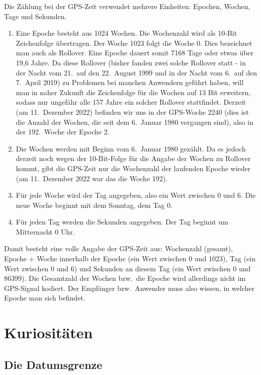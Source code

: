 Die Z\"ahlung bei der GPS-Zeit verwendet mehrere Einheiten: Epochen, Wochen, Tage und Sekunden.
\begin{enumerate}
\item
Eine Epoche 
besteht aus 1024 Wochen. Die Wochenzahl wird als 10-Bit Zeichenfolge \"ubertragen. 
Der Woche 1023 folgt die Woche 0. Dies bezeichnet man auch als Rollover. 
Eine Epoche dauert somit
7168 Tage oder etwas \"uber 19,6 Jahre. Da diese Rollover (bisher fanden
zwei solche Rollover statt - in der Nacht vom 21.\ auf den 22.\ August 1999 und in der Nacht vom 
6.\ auf den 7.\ April 2019) zu Problemen bei manchen Anwendern gef\"uhrt haben, will
man in naher Zukunft die Zeichenfolge f\"ur die Wochen auf 13 Bit erweitern, sodass nur ungef\"ahr alle 157 Jahre
ein solcher Rollover stattfindet. Derzeit (am 11.\ Dezember 2022) befinden wir uns in der GPS-Woche 2240 (dies ist
die Anzahl der Wochen, die seit dem 6.\ Januar 1980 vergangen sind), also in der 192.\ Woche der Epoche 2.
\item
Die Wochen 
werden mit Beginn vom 6.\ Januar 1980 gez\"ahlt. Da es jedoch derzeit noch wegen der 10-Bit-Folge
f\"ur die Angabe der Wochen zu Rollover kommt, gibt die GPS-Zeit nur die Wochenzahl der laufenden Epoche
wieder (am 11.\ Dezember 2022 war das die Woche 192). 
\item
F\"ur jede Woche wird der Tag angegeben, also ein Wert zwischen 0 und 6. Die neue Woche beginnt
mit dem Sonntag, dem Tag 0. 
\item
F\"ur jeden Tag werden die Sekunden angegeben. Der Tag beginnt um Mitternacht 0 Uhr.  
\end{enumerate}
Damit besteht eine volle Angabe der GPS-Zeit aus: Wochenzahl (gesamt), Epoche + Woche innerhalb der
Epoche (ein Wert zwischen 0 und 1023), Tag (ein Wert zwischen 0 und 6) und Sekunden an diesem Tag
(ein Wert zwischen 0 und 86399). Die Gesamtzahl der Wochen bzw.\ die Epoche wird allerdings nicht im GPS-Signal kodiert. 
Der Empf\"anger bzw.\ Anwender muss also wissen, in welcher Epoche man sich befindet. 

\section{Kuriosit\"aten}

\subsection{Die Datumsgrenze}

